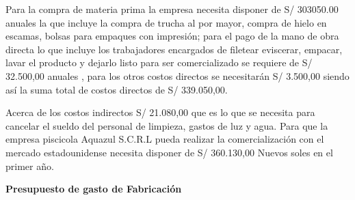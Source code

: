 \documentclass[
  stu,
  floatsintext,
  longtable,
  a4paper,
  nolmodern,
  notxfonts,
  notimes,
  12pt,
  colorlinks=true,linkcolor=blue,citecolor=blue,urlcolor=blue]{apa7}
\begin{document}
Para la compra de materia prima la empresa necesita disponer de S/
303050.00 anuales la que incluye la compra de trucha al por mayor,
compra de hielo en escamas, bolsas para empaques con impresión; para el
pago de la mano de obra directa lo que incluye los trabajadores
encargados de filetear eviscerar, empacar, lavar el producto y dejarlo
listo para ser comercializado se requiere de S/ 32.500,00 anuales , para
los otros costos directos se necesitarán S/ 3.500,00 siendo así la suma
total de costos directos de S/ 339.050,00.

Acerca de los costos indirectos S/ 21.080,00 que es lo que se necesita
para cancelar el sueldo del personal de limpieza, gastos de luz y agua.
Para que la empresa piscicola Aquazul S.C.R.L pueda realizar la
comercialización con el mercado estadounidense necesita disponer de S/
360.130,00 Nuevos soles en el primer año.

\textbf{Presupuesto de gasto de Fabricación}
\end{document}
